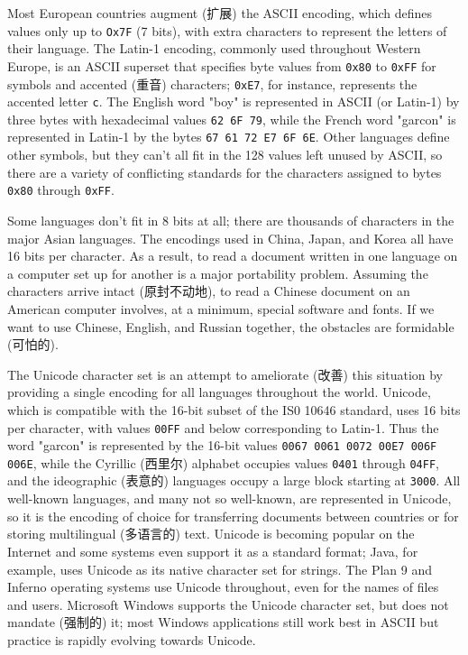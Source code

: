 Most European countries augment (扩展) the ASCII encoding, which defines
values only up to \verb'Ox7F' (7 bits), with extra characters to represent
the letters of their language.  The Latin-1 encoding, commonly used
throughout Western Europe, is an ASCII superset that specifies byte values
from \verb'0x80' to \verb'0xFF' for symbols and accented (重音) characters;
\verb'0xE7', for instance, represents the accented letter \verb'c'. The
English word "boy" is represented in ASCII (or Latin-1) by three bytes with
hexadecimal values \verb'62 6F 79', while the French word "garcon" is
represented in Latin-1 by the bytes \verb'67 61 72 E7 6F 6E'. Other
languages define other symbols, but they can't all fit in the 128 values
left unused by ASCII, so there are a variety of conflicting standards for
the characters assigned to bytes \verb'0x80' through \verb'0xFF'.

Some languages don't fit in 8 bits at all; there are thousands of
characters in the major Asian languages. The encodings used in China,
Japan, and Korea all have 16 bits per character. As a result, to read a
document written in one language on a computer set up for another is a
major portability problem. Assuming the characters arrive intact
(原封不动地), to read a Chinese document on an American computer involves,
at a minimum, special software and fonts. If we want to use Chinese,
English, and Russian together, the obstacles are formidable (可怕的).

The Unicode character set is an attempt to ameliorate (改善) this situation
by providing a single encoding for all languages throughout the world.
Unicode, which is compatible with the 16-bit subset of the IS0 10646
standard, uses 16 bits per character, with values \verb'00FF' and below
corresponding to Latin-1. Thus the word "garcon" is represented by the
16-bit values \verb'0067 0061 0072 00E7 006F 006E', while the Cyrillic
(西里尔) alphabet occupies values \verb'0401' through \verb'04FF', and the
ideographic (表意的) languages occupy a large block starting at
\verb'3000'. All well-known languages, and many not so well-known, are
represented in Unicode, so it is the encoding of choice for transferring
documents between countries or for storing multilingual (多语言的) text.
Unicode is becoming popular on the Internet and some systems even support
it as a standard format; Java, for example, uses Unicode as its native
character set for strings. The Plan 9 and Inferno operating systems use
Unicode throughout, even for the names of files and users.  Microsoft
Windows supports the Unicode character set, but does not mandate (强制的)
it; most Windows applications still work best in ASCII but practice is
rapidly evolving towards Unicode.

